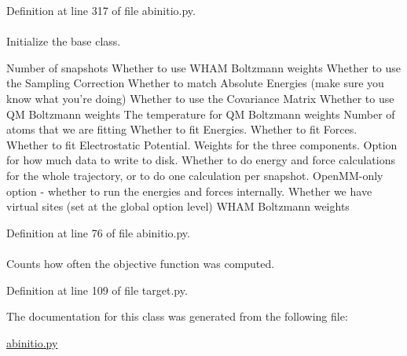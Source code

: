 \-Definition at line 317 of file abinitio.\-py.

\hypertarget{classforcebalance_1_1abinitio_1_1AbInitio_ae5c60f421336c2ecb716be16b8d51fdf}{
\paragraph[{whamboltz\-\_\-wts}]{}}\label{classforcebalance_1_1abinitio_1_1AbInitio_ae5c60f421336c2ecb716be16b8d51fdf}


\-Initialize the base class. 

\-Number of snapshots \-Whether to use \-W\-H\-A\-M \-Boltzmann weights \-Whether to use the \-Sampling \-Correction \-Whether to match \-Absolute \-Energies (make sure you know what you're doing) \-Whether to use the \-Covariance \-Matrix \-Whether to use \-Q\-M \-Boltzmann weights \-The temperature for \-Q\-M \-Boltzmann weights \-Number of atoms that we are fitting \-Whether to fit \-Energies. \-Whether to fit \-Forces. \-Whether to fit \-Electrostatic \-Potential. \-Weights for the three components. \-Option for how much data to write to disk. \-Whether to do energy and force calculations for the whole trajectory, or to do one calculation per snapshot. \-Open\-M\-M-\/only option -\/ whether to run the energies and forces internally. \-Whether we have virtual sites (set at the global option level) \-W\-H\-A\-M \-Boltzmann weights 

\-Definition at line 76 of file abinitio.\-py.

\hypertarget{classforcebalance_1_1target_1_1Target_ad4cd0ab38d8fc97d3e7a6e22ce130a16}{
\paragraph[{xct}]{}}\label{classforcebalance_1_1target_1_1Target_ad4cd0ab38d8fc97d3e7a6e22ce130a16}


\-Counts how often the objective function was computed. 



\-Definition at line 109 of file target.\-py.



\-The documentation for this class was generated from the following file\-:\begin{DoxyCompactItemize}
\item 
\hyperlink{abinitio_8py}{abinitio.\-py}\end{DoxyCompactItemize}

